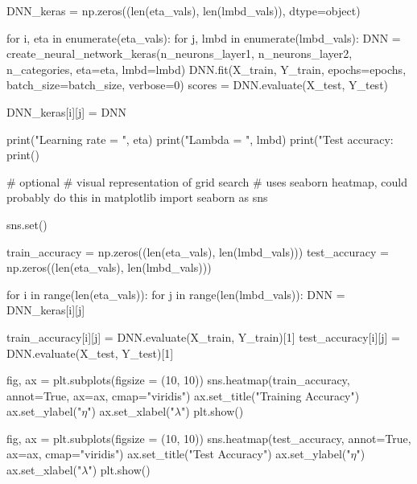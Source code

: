 \documentclass[%
oneside,                 %
final,                   %
10pt]{article}
\begin{document}
\bpycod
DNN_keras = np.zeros((len(eta_vals), len(lmbd_vals)), dtype=object)
        
for i, eta in enumerate(eta_vals):
    for j, lmbd in enumerate(lmbd_vals):
        DNN = create_neural_network_keras(n_neurons_layer1, n_neurons_layer2, n_categories,
                                         eta=eta, lmbd=lmbd)
        DNN.fit(X_train, Y_train, epochs=epochs, batch_size=batch_size, verbose=0)
        scores = DNN.evaluate(X_test, Y_test)
        
        DNN_keras[i][j] = DNN
        
        print("Learning rate = ", eta)
        print("Lambda = ", lmbd)
        print("Test accuracy: %
        print()

\epycod


































\bpycod
# optional
# visual representation of grid search
# uses seaborn heatmap, could probably do this in matplotlib
import seaborn as sns

sns.set()

train_accuracy = np.zeros((len(eta_vals), len(lmbd_vals)))
test_accuracy = np.zeros((len(eta_vals), len(lmbd_vals)))

for i in range(len(eta_vals)):
    for j in range(len(lmbd_vals)):
        DNN = DNN_keras[i][j]

        train_accuracy[i][j] = DNN.evaluate(X_train, Y_train)[1]
        test_accuracy[i][j] = DNN.evaluate(X_test, Y_test)[1]

        
fig, ax = plt.subplots(figsize = (10, 10))
sns.heatmap(train_accuracy, annot=True, ax=ax, cmap="viridis")
ax.set_title("Training Accuracy")
ax.set_ylabel("$\eta$")
ax.set_xlabel("$\lambda$")
plt.show()

fig, ax = plt.subplots(figsize = (10, 10))
sns.heatmap(test_accuracy, annot=True, ax=ax, cmap="viridis")
ax.set_title("Test Accuracy")
ax.set_ylabel("$\eta$")
ax.set_xlabel("$\lambda$")
plt.show()

\epycod




\end{document}
